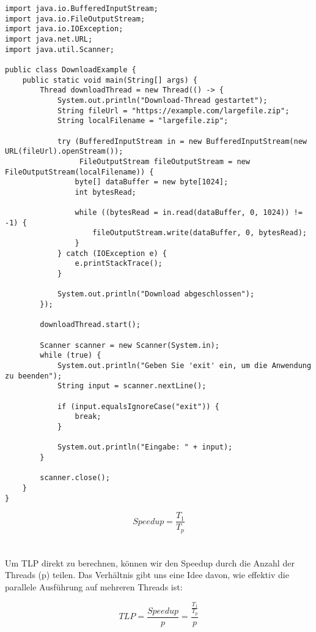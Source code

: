 \noindent\begin{lstlisting}[caption={Threads zur Organisation},captionpos=b,label={lst:down}]
import java.io.BufferedInputStream;
import java.io.FileOutputStream;
import java.io.IOException;
import java.net.URL;
import java.util.Scanner;

public class DownloadExample {
    public static void main(String[] args) {
        Thread downloadThread = new Thread(() -> {
            System.out.println("Download-Thread gestartet");
            String fileUrl = "https://example.com/largefile.zip";
            String localFilename = "largefile.zip";

            try (BufferedInputStream in = new BufferedInputStream(new URL(fileUrl).openStream());
                 FileOutputStream fileOutputStream = new FileOutputStream(localFilename)) {
                byte[] dataBuffer = new byte[1024];
                int bytesRead;

                while ((bytesRead = in.read(dataBuffer, 0, 1024)) != -1) {
                    fileOutputStream.write(dataBuffer, 0, bytesRead);
                }
            } catch (IOException e) {
                e.printStackTrace();
            }

            System.out.println("Download abgeschlossen");
        });

        downloadThread.start();

        Scanner scanner = new Scanner(System.in);
        while (true) {
            System.out.println("Geben Sie 'exit' ein, um die Anwendung zu beenden");
            String input = scanner.nextLine();

            if (input.equalsIgnoreCase("exit")) {
                break;
            }

            System.out.println("Eingabe: " + input);
        }

        scanner.close();
    }
}
\end{lstlisting}

\begin{equation}
    Speedup = \frac{T_1}{T_p}
\end{equation}\\\\


Um TLP direkt zu berechnen, können wir den Speedup durch die Anzahl der Threads (p) teilen. Das Verhältnis gibt uns eine Idee davon, wie effektiv die parallele Ausführung auf mehreren Threads ist:

\begin{equation}
    TLP = \frac{Speedup}{p} = \frac{\frac{T_1}{T_p}}{p}
\end{equation}

